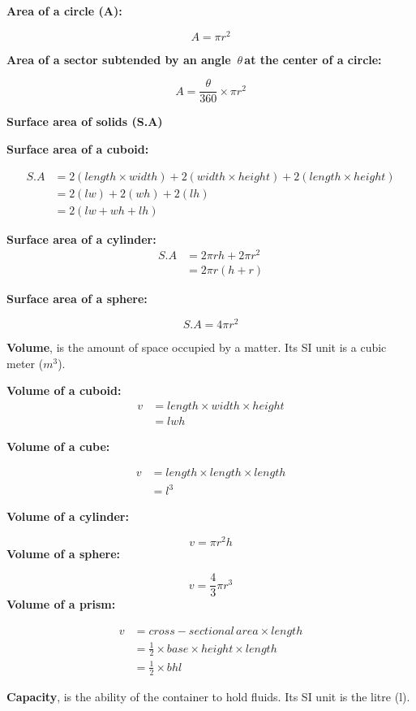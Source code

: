 \documentclass[
  a4paperpaper,
]{scrbook}
\begin{document}
\textbf{Area of a circle (A):}

\[A=\pi r^2\]

\textbf{Area of a sector subtended by an angle \,$\theta $\,at the center of a circle:}

\[A=\frac{\theta}{360} \times\pi r^2\]

\centerline{\textbf{Surface area of solids (S.A)}}

\textbf{Surface area of a cuboid:}

\[
\begin{align*}
S.A&=2(length \times width)+2(width \times height)+2(length\times height)\\
&=2(lw)+2(wh)+2(lh)\\
&=2(lw+wh+lh)
\end{align*}
\]

\textbf{Surface area of a cylinder:} \[
\begin{align*}
S.A&=2\pi rh+2\pi r^2\\&=2\pi r(h+r)
\end{align*}
\]

\textbf{Surface area of a sphere:}

\[S.A=4\pi r^2\]

\textbf{Volume}, is the amount of space occupied by a matter. Its SI
unit is a cubic meter (\(m^3\)).

\textbf{Volume of a cuboid:} \[
\begin{align*}
v&=length \times width \times height\\&=lwh
\end{align*}
\]

\textbf{Volume of a cube:}

\[
\begin{align*}
v&=length \times length \times length \\
&=l^3 
\end{align*}
\]

\textbf{Volume of a cylinder:}

\[ v=\pi r^2 h\] \textbf{Volume of a sphere:}

\[ v=\frac{4}{3} \pi r^3\] \textbf{Volume of a prism:}

\[ 
\begin{align*}
v&=cross-sectional \,area \times length \\
&=\frac{1}{2}\times base\times height\times length\\
&=\frac{1}{2}\times bhl
\end{align*}
\]

\textbf{Capacity}, is the ability of the container to hold fluids. Its
SI unit is the litre (l).
\end{document}
